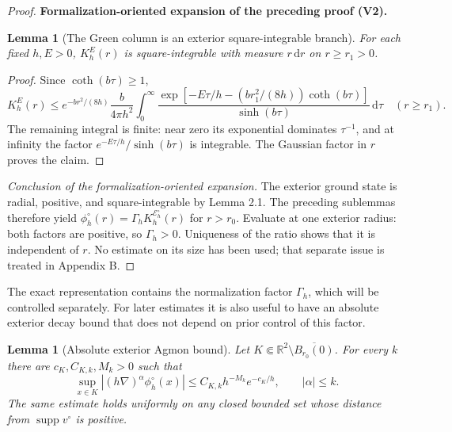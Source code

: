 \documentclass[11pt]{article}
\newtheorem{lemma}[theorem]{Lemma}
\newcommand{\formalisationparentid}{X}
\newenvironment{formalisationaddition}[1]{\par\medskip\begingroup\color{blue}\def\formalisationparentid{#1}\setcounter{formalizationsublemma}{0}\let\lemma\formalizationsublemma\let\endlemma\endformalizationsublemma
  \def\Eo{\mathcal E_h^\circ}\def\EE{\mathcal E_h}\def\phio{\phi_h^\circ}\def\phih{\phi_h}\def\Ho{H_h^{\rm atom}(v^\circ)}\def\Ha{H_h^{\rm atom}}\def\HL{H_h^{L}}\def\Dh{D_h}\def\Log{\operatorname{Log}}\def\ellh{\ell_h}\def\Gp{G_{p,h}}\def\Ast{A_{*,h}}\def\ahat{\widehat{\mathfrak a}_h}\def\ah{\mathfrak a_h}\def\rh{\widehat\rho_h}\def\deltah{\widehat\delta_h}\def\oldref##1{\textup{(##1)}}\def\interface##1{\par\noindent\textit{Analytical interface used here.} ##1\par}\def\finish{\par\noindent\textit{Conclusion of the formalization-oriented expansion.} }\par\noindent\textbf{Formalization-oriented expansion of the preceding proof (V2).}\par\smallskip
}{\par\endgroup\medskip
}
\newcommand{\R}{\mathbb R}
\newcommand{\abs}[1]{\left|#1\right|}
\newcommand{\supp}{\operatorname{supp}}
\begin{document}
\begin{proof}
\begin{formalisationaddition}{P2.4}
\begin{lemma}[The Green column is an exterior square-integrable branch]\label{sublemma:P2-4-kernel-decay}
For each fixed $h,E>0$, $K_h^E(r)$ is square-integrable with measure $r\,\mathrm dr$ on $r\ge r_1>0$.
\end{lemma}
\begin{proof}
Since $\coth(b\tau)\ge1$,
\[
 K_h^E(r)\le e^{-br^2/(8h)}\frac b{4\pi h^2}
 \int_0^\infty\frac{\exp[-E\tau/h-(br_1^2/(8h))\coth(b\tau)]}{\sinh(b\tau)}\,\mathrm d\tau
 \quad(r\ge r_1).
\]
The remaining integral is finite: near zero its exponential dominates $\tau^{-1}$, and at infinity the factor $e^{-E\tau/h}/\sinh(b\tau)$ is integrable. The Gaussian factor in $r$ proves the claim.
\end{proof}
\finish The exterior ground state is radial, positive, and square-integrable by Lemma 2.1. The preceding sublemmas therefore yield $\phio(r)=\Gamma_hK_h^{\Eo}(r)$ for $r>r_0$. Evaluate at one exterior radius: both factors are positive, so $\Gamma_h>0$. Uniqueness of the ratio shows that it is independent of $r$. No estimate on its size has been used; that separate issue is treated in Appendix B.
\end{formalisationaddition}

\end{proof}

The exact representation  contains the normalization factor $\Gamma_h$, which will be controlled separately.  For later estimates it is also useful to have an absolute exterior decay bound that does not depend on prior control of this factor.

\begin{lemma}[Absolute exterior Agmon bound]\label{lem:radial-agmon}
Let $K\Subset\R^2\setminus\overline{B_{r_0}(0)}$.  For every $k$ there are $c_K,C_{K,k},M_k>0$ such that
\begin{equation}\label{eq:absolute-agmon}
 \sup_{x\in K}\abs{(h\nabla)^\alpha\phi_h^\circ(x)}
 \le C_{K,k}h^{-M_k}e^{-c_K/h},
 \qquad |\alpha|\le k.
\end{equation}
The same estimate holds uniformly on any closed bounded set whose distance from $\supp v^\circ$ is positive.
\end{lemma}
\end{document}
